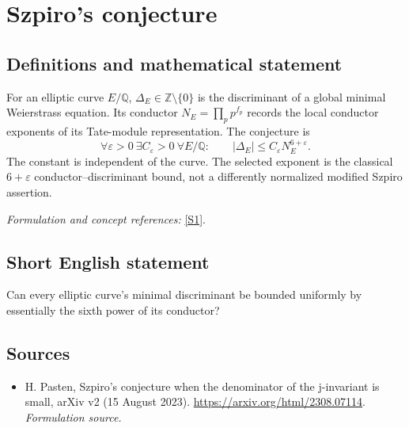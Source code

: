 \documentclass[11pt]{article}
\begin{document}
\section*{\texorpdfstring{Szpiro's conjecture}{Szpiro's conjecture}}\label{statement}
\subsection{Definitions and mathematical statement}
For an elliptic curve $E/{\mathbb{Q}}$, $\Delta_E\in{\mathbb{Z}}\setminus\{0\}$ is the discriminant of a global minimal Weierstrass equation. Its conductor $N_E=\prod_p p^{f_p}$ records the local conductor exponents of its Tate-module representation. The conjecture is
\[
 \forall\varepsilon>0\ \exists C_\varepsilon>0\ \forall E/{\mathbb{Q}}:\qquad
 |\Delta_E|\le C_\varepsilon N_E^{6+\varepsilon}.
\]
The constant is independent of the curve. The selected exponent is the classical $6+\varepsilon$ conductor--discriminant bound, not a differently normalized modified Szpiro assertion.
\par\smallskip\textit{Formulation and concept references:} \href{https://arxiv.org/html/2308.07114}{[S1]}.

\subsection{Short English statement}
Can every elliptic curve's minimal discriminant be bounded uniformly by essentially the sixth power of its conductor?
\subsection{Sources}
\begin{itemize}
\item[S1]H. Pasten, Szpiro's conjecture when the denominator of the j-invariant is small, arXiv v2 (15 August 2023).
\url{https://arxiv.org/html/2308.07114}.
\textit{Formulation source.}
\end{itemize}
\end{document}
